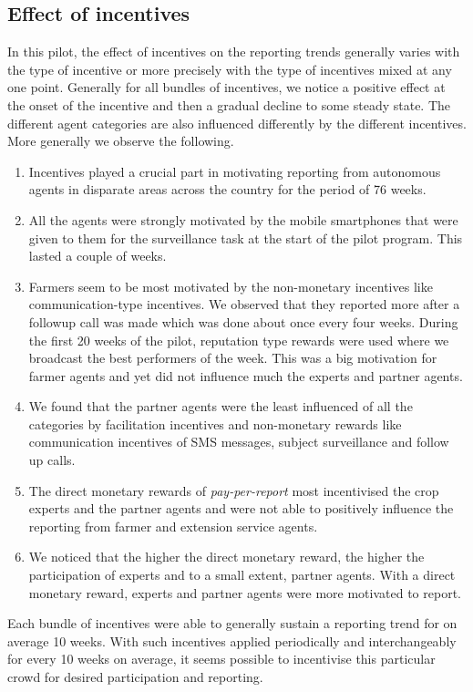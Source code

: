 \documentclass[letterpaper]{article} %
\begin{document}
\subsection{Effect of incentives}
In this pilot, the effect of incentives on the reporting trends generally varies with the type of incentive or more precisely with the type of incentives mixed at any one point. Generally for all bundles of incentives, we notice a positive effect at the onset of the incentive and then a gradual decline to some steady state. The different agent categories are also influenced differently by the different incentives. More generally we observe the following.
\begin{enumerate}
\item Incentives played a crucial part in motivating reporting from autonomous agents in disparate areas across the country for the period of 76 weeks.
\item All the agents were strongly motivated by the mobile smartphones that were given to them for the surveillance task at the start of the pilot program. This lasted a couple of weeks.
\item Farmers seem to be most motivated by the non-monetary incentives like communication-type incentives. We observed that they reported more after a followup call was made which was done about once every four weeks. During the first 20 weeks of the pilot, reputation type rewards were used where we broadcast the best performers of the week. This was a big motivation for farmer agents and yet did not influence much the experts and partner agents.
\item We found that the partner agents were the least influenced of all the categories by facilitation incentives and non-monetary rewards like communication incentives of SMS messages, subject surveillance and follow up calls. 
\item The direct monetary rewards of \emph{pay-per-report} most incentivised the crop experts and the partner agents and were not able to positively influence the reporting from farmer and extension service agents.
\item We noticed that the higher the direct monetary reward, the higher the participation of experts and to a small extent, partner agents. With a direct monetary reward, experts and partner agents were more motivated to report. 
\end{enumerate}

Each bundle of incentives were able to generally sustain a reporting trend for on average 10 weeks. With such incentives applied periodically and interchangeably for every 10 weeks on average, it seems possible to incentivise this particular crowd for desired participation and reporting.
\end{document}
